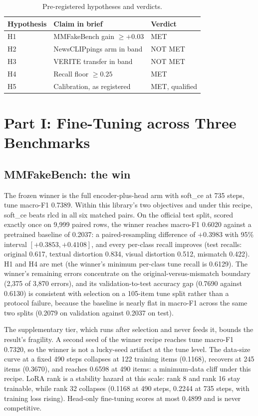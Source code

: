 \documentclass[conference]{IEEEtran}
\begin{document}
\begin{table}[t]
\centering
\caption{Pre-registered hypotheses and verdicts.}
\label{tab:hypotheses}
\begin{tabular}{lll}
\toprule
Hypothesis & Claim in brief & Verdict \\
\midrule
H1 & MMFakeBench gain $\geq +0.03$ & MET \\
H2 & NewsCLIPpings arm in band & NOT MET \\
H3 & VERITE transfer in band & NOT MET \\
H4 & Recall floor $\geq 0.25$ & MET \\
H5 & Calibration, as registered & MET, qualified \\
\bottomrule
\end{tabular}
\end{table}

\section{Part I: Fine-Tuning across Three Benchmarks}

\subsection{MMFakeBench: the win}

The frozen winner is the full encoder-plus-head arm with soft\_ce at 735 steps, tune macro-F1 0.7389. Within this library's two objectives and under this recipe, soft\_ce beats rlcd in all six matched pairs. On the official test split, scored exactly once on 9,999 paired rows, the winner reaches macro-F1 0.6020 against a pretrained baseline of 0.2037: a paired-resampling difference of $+0.3983$ with 95\% interval $[+0.3853, +0.4108]$, and every per-class recall improves (test recalls: original 0.617, textual distortion 0.834, visual distortion 0.512, mismatch 0.422). H1 and H4 are met (the winner's minimum per-class tune recall is 0.6129). The winner's remaining errors concentrate on the original-versus-mismatch boundary (2,375 of 3,870 errors), and its validation-to-test accuracy gap (0.7690 against 0.6130) is consistent with selection on a 105-item tune split rather than a protocol failure, because the baseline is nearly flat in macro-F1 across the same two splits (0.2079 on validation against 0.2037 on test).

The supplementary tier, which runs after selection and never feeds it, bounds the result's fragility. A second seed of the winner recipe reaches tune macro-F1 0.7320, so the winner is not a lucky-seed artifact at the tune level. The data-size curve at a fixed 490 steps collapses at 122 training items (0.1168), recovers at 245 items (0.3670), and reaches 0.6598 at 490 items: a minimum-data cliff under this recipe. LoRA rank is a stability hazard at this scale: rank 8 and rank 16 stay trainable, while rank 32 collapses (0.1168 at 490 steps, 0.2244 at 735 steps, with training loss rising). Head-only fine-tuning scores at most 0.4899 and is never competitive.
\end{document}
